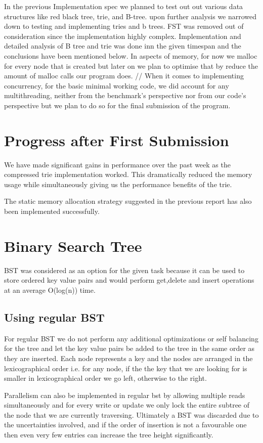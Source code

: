 \documentclass{article}
\begin{document}
In the previous Implementation spec we planned to test out out various data structures like red black tree, trie, and B-tree. upon further analysis we narrowed down to testing and implementing tries and b trees. FST was removed out of consideration since the implementation highly complex. Implementation and detailed analysis of B tree and trie was done inn the given timespan and the conclusions have been mentioned below. In aspects of memory, for now we malloc for every node that is created but later on we plan to optimise that by reduce the amount of malloc calls our program does. //
When it comes to implementing concurrency, for the basic minimal working code, we did account for any multithreading, neither from the benchmark's perspective nor from our code's perspective but we plan to do so for the final submission of the program.

\section{Progress after First Submission}

We have made significant gains in performance over the past week as the compressed trie implementation worked. This dramatically reduced the memory usage while simultaneously giving us the performance benefits of the trie.

The static memory allocation strategy suggested in the previous report has also been implemented successfully. 

\section{Binary Search Tree}
BST was considered as an option for the given task because it can be used to store ordered key value pairs and would perform get,delete and insert operations at an average O(log(n)) time.  

\subsection{Using regular BST}
For regular BST we do not perform any additional optimizations or self balancing for the tree and let the key value pairs be added to the tree in the same order as they are inserted. Each node represents a key and the nodes are arranged in the lexicographical order i.e. for any node, if the the key that we are looking for is smaller in lexicographical order we go left, otherwise to the right.

Parallelism can also be implemented in regular bst by allowing multiple reads simultaneously and for every write or update we only lock the entire subtree of the node that we are currently traversing.
Ultimately a BST was discarded due to the uncertainties involved, and if the order of insertion is not a favourable one then even very few entries can increase the tree height significantly. 
\end{document}
